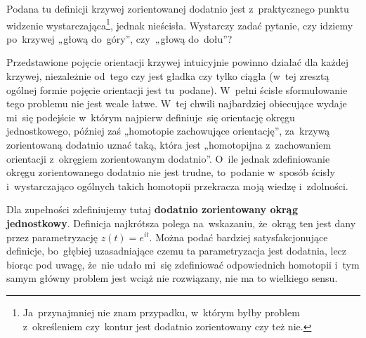 \documentclass[a4paper,11pt]{article}
\begin{document}
\vspace{\spaceFour}





\noindent
{} Podana tu definicji krzywej zorientowanej dodatnio jest
z~praktycznego punktu widzenie wystarczająca\footnote{Ja~przynajmniej nie
  znam przypadku, w~którym byłby problem z~określeniem czy~kontur jest
  dodatnio zorientowany czy też nie.}, jednak nieścisła. Wystarczy zadać
pytanie, czy idziemy po~krzywej „głową do~góry”, czy~„głową do~dołu”?

Przedstawione pojęcie orientacji krzywej intuicyjnie powinno działać
dla każdej krzywej, niezależnie od~tego czy jest gładka czy tylko
ciągła (w~tej zresztą ogólnej formie pojęcie orientacji jest
tu~podane). W~pełni ścisłe sformułowanie tego problemu nie jest wcale
łatwe. W~tej chwili najbardziej obiecujące wydaje mi~się podejście
w~którym najpierw definiuje~się orientację okręgu jednostkowego,
później zaś „homotopie zachowujące orientację”, za~krzywą zorientowaną
dodatnio uznać taką, która jest „homotopijna z~zachowaniem orientacji
z~okręgiem zorientowanym dodatnio”. O~ile jednak zdefiniowanie okręgu
zorientowanego dodatnio nie jest trudne, to~podanie w~sposób ścisły
i~wystarczająco ogólnych takich homotopii przekracza moją wiedzę
i~zdolności.

Dla zupełności zdefiniujemy tutaj \textbf{dodatnio zorientowany okrąg
  jednostkowy}. Definicja najkrótsza polega na~wskazaniu, że~okrąg ten
jest dany przez parametryzację $z( t ) = e^{ i t }$. Można podać
bardziej satysfakcjonujące definicje, bo~głębiej uzasadniające czemu
ta parametryzacja jest dodatnia, lecz biorąc pod uwagę, że~nie udało
mi~się zdefiniować odpowiednich homotopii i~tym samym główny problem
jest wciąż nie rozwiązany, nie ma to wielkiego sensu.

\vspace{\spaceFour}
\end{document}
